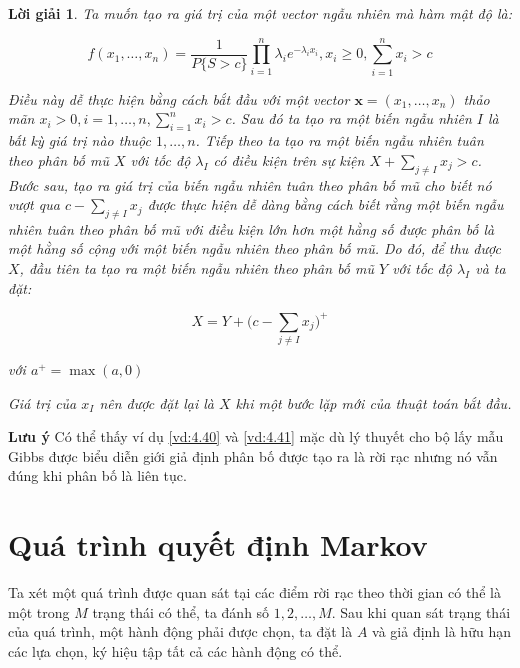 \documentclass[14pt, a4paper]{article}
\numberwithin{equation}{section}
\numberwithin{figure}{section}
\theoremstyle{sltheorem}
\theoremstyle{soltheorem}
\newtheorem*{loigiai}{Lời giải}
\numberwithin{dl}{section}
\numberwithin{md}{section}
\numberwithin{vd}{section}
\begin{document}
    \begin{loigiai}
        Ta muốn tạo ra giá trị của một vector ngẫu nhiên mà hàm mật độ là:

        \begin{equation*}
            f(x_1, \dots, x_n) = \dfrac{1}{P \lbrace S > c \rbrace} \prod_{i=1}^n \lambda_i e^{-\lambda_i x_i}, x_i \geq 0, \sum_{i=1}^n x_i > c
        \end{equation*}

        Điều này dễ thực hiện bằng cách bắt đầu với một vector $\mathbf{x}=(x_1, \dots, x_n)$ thảo mãn $x_i > 0, i=1, \dots, n, \sum_{i=1}^n x_i > c$.
        Sau đó ta tạo ra một biến ngẫu nhiên $I$ là bất kỳ giá trị nào thuộc $1, \dots, n$.
        Tiếp theo ta tạo ra một biến ngẫu nhiên tuân theo phân bố mũ $X$ với tốc độ $\lambda_I$ có điều kiện trên sự kiện $X + \sum_{j \neq I} x_j > c$.
        Bước sau, tạo ra giá trị của biến ngẫu nhiên tuân theo phân bố mũ cho biết nó vượt qua $c - \sum_{j \neq I} x_j$ được thực hiện dễ dàng bằng cách biết rằng một biến ngẫu nhiên tuân theo phân bố mũ với điều kiện lớn hơn một hằng số được phân bố là một hằng số cộng với một biến ngẫu nhiên theo phân bố mũ.
        Do đó, để thu được $X$, đầu tiên ta tạo ra một biến ngẫu nhiên theo phân bố mũ $Y$ với tốc độ $\lambda_I$ và ta đặt:\

        \begin{equation*}
            X = Y + \Bigg ( c - \sum_{j \neq I} x_j \Bigg)^+
        \end{equation*}

        với $a^+ = \max(a, 0)$

        Giá trị của $x_I$ nên được đặt lại là $X$ khi một bước lặp mới của thuật toán bắt đầu.
    \end{loigiai}

    \textbf{Lưu ý} Có thể thấy ví dụ \ref{vd:4.40} và \ref{vd:4.41} mặc dù lý thuyết cho bộ lấy mẫu Gibbs được biểu diễn giới giả định phân bố được tạo ra là rời rạc nhưng nó vẫn đúng khi phân bố là liên tục.
    
    \section{Quá trình quyết định Markov}

    Ta xét một quá trình được quan sát tại các điểm rời rạc theo thời gian có thể là một trong $M$ trạng thái có thể, ta đánh số $1, 2, \dots, M$.
    Sau khi quan sát trạng thái của quá trình, một hành động phải được chọn, ta đặt là $A$ và giả định là hữu hạn các lựa chọn, ký hiệu tập tất cả các hành động có thể.
\end{document}
